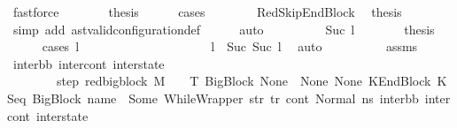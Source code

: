 \begin{isabellebody}
\ fastforce\isanewline
\ \ \ \ \isamarkupfalse%
\ \isamarkupfalse%
\ {\isacharquery}{\kern0pt}thesis\isanewline
\ \ \ \ \isamarkupfalse%
\ cases\isanewline
\ \ \ \ \ \ \isamarkupfalse%
\ RedSkipEndBlock\ \isamarkupfalse%
\ {\isacharquery}{\kern0pt}thesis\ \isamarkupfalse%
\ {\isacharparenleft}{\kern0pt}simp\ add{\isacharcolon}{\kern0pt}\ ast{\isacharunderscore}{\kern0pt}valid{\isacharunderscore}{\kern0pt}configuration{\isacharunderscore}{\kern0pt}def{\isacharparenright}{\kern0pt}\isanewline
\ \ \ \ \isamarkupfalse%
\ auto\isanewline
\ \ \isamarkupfalse%
\isanewline
\ \ \ \ \isamarkupfalse%
\ {}{\isacharcolon}{\kern0pt}\ {\isacharparenleft}{\kern0pt}Suc\ l{}{\isacharparenright}{\kern0pt}\isanewline
\ \ \ \ \isamarkupfalse%
\ \isamarkupfalse%
\ {\isacharquery}{\kern0pt}thesis\isanewline
\ \ \ \ \isamarkupfalse%
\ {\isacharparenleft}{\kern0pt}cases\ l{}{\isacharparenright}{\kern0pt}\isanewline
\ \ \ \ \ \ \isamarkupfalse%
\ {}\ \isanewline
\ \ \ \ \ \ \isamarkupfalse%
\ {}\ {}\ \isamarkupfalse%
\ {\isachardoublequoteopen}l\ {\isacharequal}{\kern0pt}\ Suc\ {\isacharparenleft}{\kern0pt}Suc\ l{}{\isacharparenright}{\kern0pt}{\isachardoublequoteclose}\ \isamarkupfalse%
\ auto\isanewline
\ \ \ \ \ \ \isamarkupfalse%
\ {}\ {}\ assms\ \isamarkupfalse%
\ inter{\isacharunderscore}{\kern0pt}bb\ inter{\isacharunderscore}{\kern0pt}cont\ inter{\isacharunderscore}{\kern0pt}state\ \ \isanewline
\ \ \ \ \ \ \ \ step{}{\isacharcolon}{\kern0pt}\ {\isachardoublequoteopen}{\isacharparenleft}{\kern0pt}red{\isacharunderscore}{\kern0pt}bigblock\ M\ {\isasymLambda}\ {\isasymGamma}\ {\isasymOmega}\ T\ {\isacharparenleft}{\kern0pt}BigBlock\ None\ {\isacharbrackleft}{\kern0pt}{\isacharbrackright}{\kern0pt}\ None\ None{\isacharcomma}{\kern0pt}\ KEndBlock\ {\isacharparenleft}{\kern0pt}KSeq\ {\isacharparenleft}{\kern0pt}BigBlock\ name\ {\isacharbrackleft}{\kern0pt}{\isacharbrackright}{\kern0pt}\ {\isacharparenleft}{\kern0pt}Some\ {\isacharparenleft}{\kern0pt}WhileWrapper\ str{\isacharparenright}{\kern0pt}{\isacharparenright}{\kern0pt}\ tr{\isacharparenright}{\kern0pt}\ cont{}{\isacharparenright}{\kern0pt}{\isacharcomma}{\kern0pt}\ Normal\ ns{}{\isacharparenright}{\kern0pt}\ {\isacharparenleft}{\kern0pt}inter{\isacharunderscore}{\kern0pt}bb{\isacharcomma}{\kern0pt}\ inter{\isacharunderscore}{\kern0pt}cont{\isacharcomma}{\kern0pt}\ inter{\isacharunderscore}{\kern0pt}state{\isacharparenright}{\kern0pt}{\isacharparenright}{\kern0pt}{\isachardoublequoteclose}\ \ \isanewline

\end{isabellebody}
